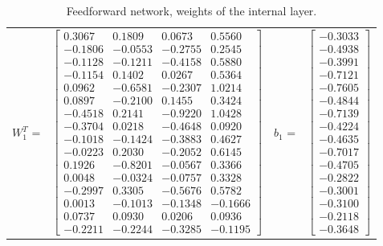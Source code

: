 \documentclass[algorithms,article,submit,pdftex,moreauthors]{Definitions/mdpi}
\begin{document}
\begin{table}[ht]
	\centering
	\caption{Feedforward network, weights of the internal layer.}
	\label{tab:matW1b1}
	
	\begin{tabular}{rlrl}  
		$W_1^T$ = & 
		$
	\begin{bmatrix}
		0.3067 &  0.1809 &  0.0673 &  0.5560 \\
		-0.1806 & -0.0553 & -0.2755 &  0.2545 \\
		-0.1128 & -0.1211 & -0.4158 &  0.5880 \\
		-0.1154 &  0.1402 &  0.0267 &  0.5364 \\
		0.0962 & -0.6581 & -0.2307 &  1.0214 \\
		0.0897 & -0.2100 &  0.1455 &  0.3424 \\
		-0.4518 &  0.2141 & -0.9220 &  1.0428 \\
		-0.3704 &  0.0218 & -0.4648 &  0.0920 \\
		-0.1018 & -0.1424 & -0.3883 &  0.4627 \\
		-0.0223 &  0.2030 & -0.2052 &  0.6145 \\
		0.1926 & -0.8201 & -0.0567 &  0.3366 \\
		0.0048 & -0.0324 & -0.0757 &  0.3328 \\
		-0.2997 &  0.3305 & -0.5676 &  0.5782 \\
		0.0013 & -0.1013 & -0.1348 & -0.1666 \\
		0.0737 &  0.0930 &  0.0206 &  0.0936 \\
		-0.2211 & -0.2244 & -0.3285 & -0.1195
		\end{bmatrix}
			$
		&
		$b_1$ = &
		$
\begin{bmatrix}
	-0.3033 \\
	-0.4938 \\
	-0.3991 \\
	-0.7121 \\
	-0.7605 \\
	-0.4844 \\
	-0.7139 \\
	-0.4224 \\
	-0.4635 \\
	-0.7017 \\
	-0.4705 \\
	-0.2822 \\
	-0.3001 \\
	-0.3100 \\
	-0.2118 \\
	-0.3648
\end{bmatrix}
		$
	\end{tabular}	
\end{table}
\end{document}
